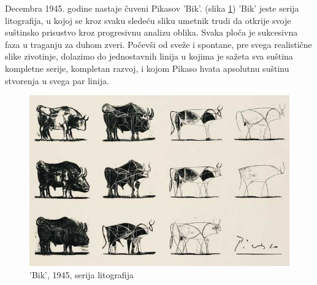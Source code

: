 \documentclass[a4paper]{article}
\begin{document}
Decembra 1945. godine nastaje čuveni Pikasov 'Bik'. (slika \ref{fig:bull}) 'Bik' jeste serija litografija, u kojoj se kroz svaku sledeću sliku umetnik trudi da otkrije svoje suštinsko prisustvo kroz progresivnu analizu oblika. Svaka ploča je sukcesivna faza u traganju za duhom zveri. Počevši od sveže i spontane, pre svega realistične slike zivotinje, dolazimo do jednostavnih linija u kojima je sažeta sva suština kompletne serije, kompletan razvoj, i kojom Pikaso hvata apsolutnu suštinu stvorenja u svega par linija.\cite{bull}
\begin{figure}[h!]
\begin{center}
\includegraphics[scale=0.51]{bull.JPG}
\end{center}
\caption{'Bik', 1945, serija litografija}
\label{fig:bull}
\end{figure} \newline
\end{document}

